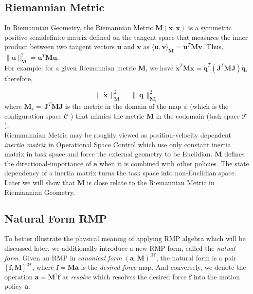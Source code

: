 \subsection{Riemannian Metric}

In Riemannian Geometry, the Riemannian Metric $\mathbf{M}(\mathbf{x}, \dot{\mathbf{x}})$ is a symmetric positive semidefinite matrix defined on the tangent space that measures the inner product between two tangent vectors $\mathbf{u}$ and $\mathbf{v}$ as $\langle \mathbf{u}, \mathbf{v} \rangle_{\mathbf{M}} = \mathbf{u}^T \mathbf{M} \mathbf{v}$. Thus, $\| \mathbf{u}\|^{2}_{\mathbf{M}} = \mathbf{u}^T \mathbf{M} \mathbf{u}$. \\[3mm]
For example, for a given Riemannian metric $\mathbf{M}$, we have $\dot{\mathbf{x}}^{T} \mathbf{M} \dot{\mathbf{x}} = \dot{\mathbf{q}}^T(\mathbf{J}^T \mathbf{M} \mathbf{J}) \dot{\mathbf{q}}$, therefore,


\begin{equation}
\|\ \dot{\mathbf{x}}  \,\|^2_{\mathbf{M}} = \|\ \dot{\mathbf{q}}  \,\|^2_{\mathbf{M}_r} 
\end{equation}
where $\mathbf{M}_r = \,\mathbf{J}^T \mathbf{M} \mathbf{J}$ is the metric in the domain of the map $\phi$ (which is the configuration space $\mathcal{C}$ ) that mimics the metric $\mathbf{M}$ in the codomain (task space $\mathcal{T}$). \\[3mm]

Riemmannian Metric may be roughly viewed as position-velocity dependent \textit{inertia matrix} in Operational Space Control which use only constant inertia matrix in task space and force the external geometry to be Euclidian. $\mathbf{M}$ defines the directional-importance of $\mathbf{a}$ when it is combined with other policies. The state dependency of a inertia matrix turns the task space into non-Euclidian space. Later we will show that $\mathbf{M}$ is close relate to the Riemannian Metric in Riemiannian Geometry.

\subsection{Natural Form RMP}
To better illustrate the physical meaning of applying RMP algebra which will be discussed later, we additionally introduce a new RMP form, called the \textit{natual form}.  Given an RMP in \textit{canonical form} $(\mathbf{a}, \mathbf{M})^{\mathcal{M}}$, the natural form is a pair $[\mathbf{f}, \mathbf{M}]^{\mathcal{M}}$, where $\mathbf{f} = \mathbf{M}\mathbf{a}$ is the \textit{desired force} map. And conversely, we denote the operation $\mathbf{a} = \mathbf{M}^{\dagger}\mathbf{f}$ as \textit{resolve} which resolves the desired force $\mathbf{f}$ into the motion policy $\mathbf{a}$.

